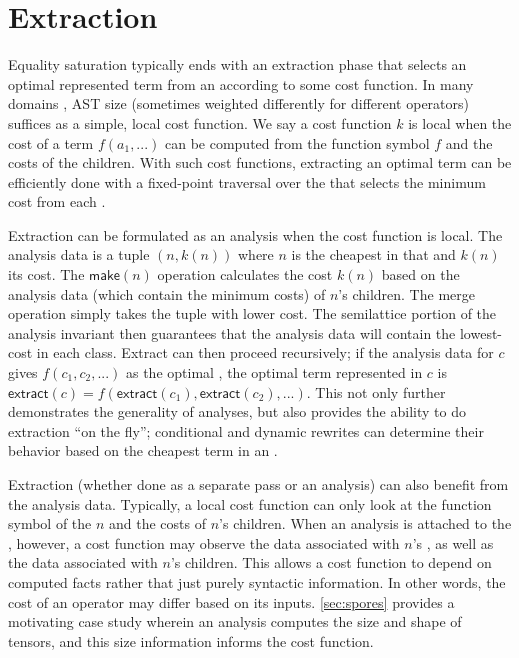 \section{Extraction}
\label{sec:tricks-extraction}

Equality saturation typically ends with an extraction phase that selects an
  optimal represented term from an \eclass according to some cost function.
In many domains \cite{herbie, szalinski}, AST size
  (sometimes weighted differently for different operators) suffices as a simple,
  local cost function.
We say a cost function $k$ is local when the cost of a term $f(a_{1}, ...)$ can be
  computed from the function symbol $f$ and the costs of the children.
With such cost functions, extracting an optimal term can be efficiently done
  with a fixed-point traversal over the \egraph that selects the minimum cost
  \enode from each \eclass \cite{herbie}.

Extraction can be formulated as an \eclass analysis when the cost function
  is local.
The analysis data is a tuple $(n, k(n))$ where $n$ is the cheapest \enode
  in that \eclass and $k(n)$ its cost.
The $\textsf{make}(n)$ operation calculates the cost $k(n)$ based on
  the analysis data (which contain the minimum costs) of $n$'s children.
The \textsf{merge} operation simply takes the tuple with lower cost.
The semilattice portion of the analysis invariant then guarantees that the
  analysis data will contain the lowest-cost \enode in each class.
Extract can then proceed recursively;
  if the analysis data for \eclass $c$ gives $f(c_{1}, c_{2}, ...)$ as the optimal \enode,
  the optimal term represented in $c$ is
  $\textsf{extract}(c) = f( \textsf{extract}(c_{1}), \textsf{extract}(c_{2}), ... )$.
This not only further demonstrates the generality of \eclass analyses, but also
  provides the ability to do extraction ``on the fly''; conditional and dynamic
  rewrites can determine their behavior based on the cheapest term in an \eclass.

Extraction (whether done as a separate pass or an \eclass analysis) can also
  benefit from the analysis data.
Typically, a local cost function can only look at the function symbol of the
  \enode $n$ and the costs of $n$'s children.
When an \eclass analysis is attached to the \egraph, however, a cost function
  may observe the data associated with $n$'s \eclass, as well as the data
  associated with $n$'s children.
This allows a cost function to depend on computed facts rather that just purely
  syntactic information.
In other words, the cost of an operator may differ based on its inputs.
\autoref{sec:spores} provides a motivating case study wherein an \eclass
  analysis computes the size and shape of tensors, and this size information
  informs the cost function.

